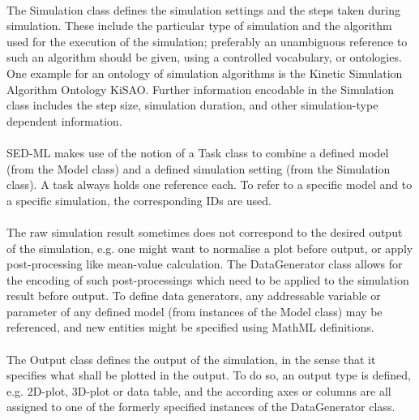 \paragraph*{}
The Simulation class defines the simulation settings and the steps taken during simulation. These include the particular type of simulation and the algorithm used for the execution of the simulation; preferably an unambiguous reference to such an algorithm should be given, using a controlled vocabulary, or ontologies. One example for an ontology of simulation algorithms is the Kinetic Simulation Algorithm Ontology KiSAO. Further information encodable in the Simulation class includes the step size, simulation duration, and other simulation-type dependent information.

\paragraph*{}
SED-ML makes use of the notion of a Task class to combine a defined model (from the Model class) and a defined simulation setting (from the Simulation class). A task always holds one reference each. To refer to a specific model and to a specific simulation, the corresponding IDs are used.

\paragraph*{}
The raw simulation result sometimes does not correspond to the desired output of the simulation, e.g. one might want to normalise a plot before output, or apply post-processing like mean-value calculation. The DataGenerator class allows for the encoding of such post-processings which need to be applied to the simulation result before output. To define data generators, any addressable variable or parameter of any defined model (from instances of the Model class) may be referenced, and new entities might be specified using MathML definitions.

\paragraph*{}
The Output class defines the output of the simulation, in the sense that it specifies what shall be plotted in the output. To do so, an output type is defined, e.g. 2D-plot, 3D-plot or data table, and the according axes or columns are all assigned to one of the formerly specified instances of the DataGenerator class.

